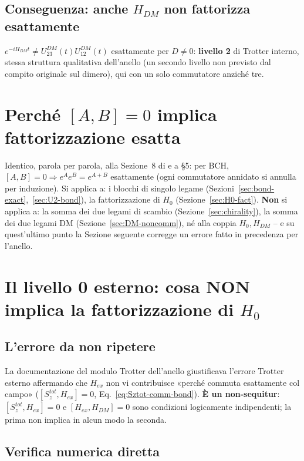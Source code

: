 \documentclass[11pt,a4paper]{article}
\begin{document}
\subsection{Conseguenza: anche $H_{DM}$ non fattorizza esattamente}

$e^{-iH_{DM}t}\neq U_{23}^{DM}(t)U_{12}^{DM}(t)$ esattamente per $D\neq0$: \textbf{livello 2} di Trotter interno, stessa struttura qualitativa dell'anello (un secondo livello non previsto dal compito originale sul dimero), qui con un solo commutatore anziché tre.

\section{Perché $[A,B]=0$ implica fattorizzazione esatta}
\label{sec:BCH}

Identico, parola per parola, alla Sezione~8 di \texttt{} e a \texttt{} \S5: per BCH, $[A,B]=0\Rightarrow e^Ae^B=e^{A+B}$ esattamente (ogni commutatore annidato si annulla per induzione). Si applica a: i blocchi di singolo legame (Sezioni~\ref{sec:bond-exact},~\ref{sec:U2-bond}), la fattorizzazione di $H_0$ (Sezione~\ref{sec:H0-fact}). \textbf{Non} si applica a: la somma dei due legami di scambio (Sezione~\ref{sec:chirality}), la somma dei due legami DM (Sezione~\ref{sec:DM-noncomm}), né alla coppia $H_0,H_{DM}$ -- e su quest'ultimo punto la Sezione seguente corregge un errore fatto in precedenza per l'anello.

\section{Il livello 0 esterno: cosa NON implica la fattorizzazione di $H_0$}
\label{sec:non-sequitur}

\subsection{L'errore da non ripetere}

La documentazione del modulo Trotter dell'anello giustificava l'errore Trotter esterno affermando che $H_{ex}$ non vi contribuisce «perché commuta esattamente col campo» ($[S_z^{tot},H_{ex}]=0$, Eq.~\eqref{eq:Sztot-comm-bond}). \textbf{È un non-sequitur}: $[S_z^{tot},H_{ex}]=0$ e $[H_{ex},H_{DM}]=0$ sono condizioni logicamente indipendenti; la prima non implica in alcun modo la seconda.

\subsection{Verifica numerica diretta}
\end{document}
